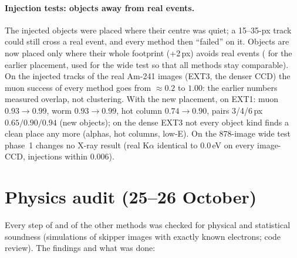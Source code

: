 \paragraph{Injection tests: objects away from real events.} The injected objects were placed where their centre was
quiet; a 15--35-px track could still cross a real event, and every method then ``failed'' on it. Objects are now
placed only where their whole footprint (+2\,px) avoids real events ( for the earlier
placement, used for the wide test so that all methods stay comparable). On the injected tracks of the real Am-241
images (EXT3, the denser CCD) the muon success of every method goes from $\approx0.2$ to $1.00$: the earlier numbers
measured overlap, not clustering. With the new placement, \AGMX{} on EXT1: muon $0.93\to0.99$, worm $0.93\to0.99$,
hot column $0.74\to0.90$, pairs 3/4/6\,px $0.65/0.90/0.94$ (new objects); on the dense EXT3 not every object kind finds
a clean place any more (alphas, hot columns, low-E). On the 878-image wide test phase~1 changes no X-ray result (real
K$\alpha$ identical to 0.0\,eV on every image-CCD, injections within 0.006).

\section{Physics audit (25--26 October)}\label{sec:audit}

Every step of \AGMX{} and of the other methods was checked for physical and statistical soundness (simulations of
skipper images with exactly known electrons; code review). The findings and what was done:

